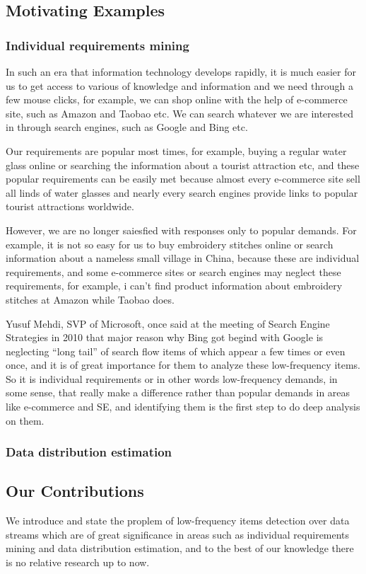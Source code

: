 \documentclass[conference]{IEEEtran}
\begin{document}
\subsection{Motivating Examples}
\subsubsection{Individual requirements mining}
In such an era that information technology develops rapidly, it is much easier for us to get access to various of knowledge and information and we need through a few mouse clicks, for example, we can shop online with the help of e-commerce site, such as Amazon and Taobao etc. We can search whatever we are interested in through search engines, such as Google and Bing etc. \par 
Our requirements are popular most times, for example, buying a regular water glass online or searching the information about a tourist attraction etc, and these popular requirements can be easily met because almost every e-commerce site sell all linds of water glasses and nearly every search engines provide links to popular tourist attractions worldwide.  \par
However, we are no longer saiesfied with responses only to popular demands. For example, it is not so easy for us to buy embroidery stitches online or search information about a nameless small village in China, because these are individual requirements, and some e-commerce sites or search engines may neglect these requirements, for example, i can't find product information about embroidery stitches at Amazon while Taobao does. \par
Yusuf Mehdi, SVP of Microsoft, once said at the meeting of Search Engine Strategies in 2010 that major reason why Bing got begind with Google is neglecting ``long tail'' of search flow items of which appear a few times or even once, and it is of great importance for them to analyze these low-frequency items. So it is individual requirements or in other words low-frequency demands, in some sense, that really make a difference rather than popular demands in areas like e-commerce and SE, and identifying them is the first step to do deep analysis on them.

\subsubsection{Data distribution estimation}

\subsection{Our Contributions}
We introduce and state the proplem of low-frequency items detection over data streams which are of great significance in areas such as individual requirements mining and data distribution estimation, and to the best of our knowledge there is no relative research up to now.\par
\end{document}
